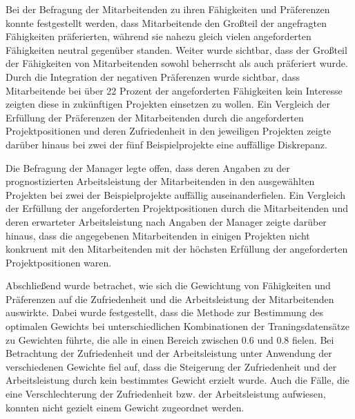 Bei der Befragung der Mitarbeitenden zu ihren Fähigkeiten und Präferenzen konnte festgestellt werden, dass Mitarbeitende den Großteil der angefragten Fähigkeiten präferierten, während sie nahezu gleich vielen angeforderten Fähigkeiten neutral gegenüber standen.
Weiter wurde sichtbar, dass der Großteil der Fähigkeiten von Mitarbeitenden sowohl beherrscht als auch präferiert wurde.
Durch die Integration der negativen Präferenzen wurde sichtbar, dass Mitarbeitende bei über 22 Prozent der angeforderten Fähigkeiten kein Interesse zeigten diese in zukünftigen Projekten einsetzen zu wollen.
Ein Vergleich der Erfüllung der Präferenzen der Mitarbeitenden durch die angeforderten Projektpositionen und deren Zufriedenheit in den jeweiligen Projekten zeigte darüber hinaus bei zwei der fünf Beispielprojekte eine auffällige Diskrepanz.

Die Befragung der Manager legte offen, dass deren Angaben zu der prognostizierten Arbeitsleistung der Mitarbeitenden in den ausgewählten Projekten bei zwei der Beispielprojekte auffällig auseinanderfielen. 
Ein Vergleich der Erfüllung der angeforderten Projektpositionen durch die Mitarbeitenden und deren erwarteter Arbeitsleistung nach Angaben der Manager zeigte darüber hinaus, dass die angegebenen Mitarbeitenden in einigen Projekten nicht konkruent mit den Mitarbeitenden mit der höchsten Erfüllung der angeforderten Projektpositionen waren.

Abschließend wurde betrachet, wie sich die Gewichtung von Fähigkeiten und Präferenzen auf die Zufriedenheit und die Arbeitsleistung der Mitarbeitenden auswirkte.
Dabei wurde festgestellt, dass die Methode zur Bestimmung des optimalen Gewichts bei unterschiedlichen Kombinationen der Traningsdatensätze zu Gewichten führte, die alle in einen Bereich zwischen 0.6 und 0.8 fielen.
Bei Betrachtung der Zufriedenheit und der Arbeitsleistung unter Anwendung der verschiedenen Gewichte fiel auf, dass die Steigerung der Zufriedenheit und der Arbeitsleistung durch kein bestimmtes Gewicht erzielt wurde.
Auch die Fälle, die eine Verschlechterung der Zufriedenheit bzw. der Arbeitsleistung aufwiesen, konnten nicht gezielt einem Gewicht zugeordnet werden.

